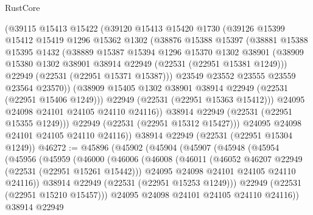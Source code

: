 \begin{lexlean}{RustCore}
\begin{coremodule}
            (@39115
              @15413
              @15422
              (@39120
                @15413
                @15420
                @1730
                (@39126
                  @15399
                  @15412
                  @15419
                  @1296
                  @15362
                  @1302
                  (@38876
                    @15388
                    @15397
                    (@38881
                      @15388
                      @15395
                      @1432
                      (@38889
                        @15387
                        @15394
                        @1296
                        @15370
                        @1302
                        @38901
                        (@38909 @15380 @1302 @38901 @38914 @22949 (@22531 (@22951 @15381 @1249)))
                        @22949
                        (@22531 (@22951 @15371 @15387)))
                      @23549
                      @23552
                      @23555
                      @23559
                      @23564
                      @23570))
                  (@38909 @15405 @1302 @38901 @38914 @22949 (@22531 (@22951 @15406 @1249)))
                  @22949
                  (@22531 (@22951 @15363 @15412)))
                @24095
                @24098
                @24101
                @24105
                @24110
                @24116))
            @38914
            @22949
            (@22531 (@22951 @15355 @1249)))
          @22949
          (@22531 (@22951 @15312 @15427)))
        @24095
        @24098
        @24101
        @24105
        @24110
        @24116))
    @38914
    @22949
    (@22531 (@22951 @15304 @1249))
@46272 := @45896
    (@45902
      (@45904
        (@45907
          (@45948
            (@45954
              (@45956
                (@45959
                  (@46000
                    (@46006
                      (@46008
                        (@46011
                          (@46052 @46207 @22949 (@22531 (@22951 @15261 @15442)))
                          @24095
                          @24098
                          @24101
                          @24105
                          @24110
                          @24116))
                      @38914
                      @22949
                      (@22531 (@22951 @15253 @1249)))
                    @22949
                    (@22531 (@22951 @15210 @15457)))
                  @24095
                  @24098
                  @24101
                  @24105
                  @24110
                  @24116))
              @38914
              @22949

\end{coremodule}
\end{lexlean}
